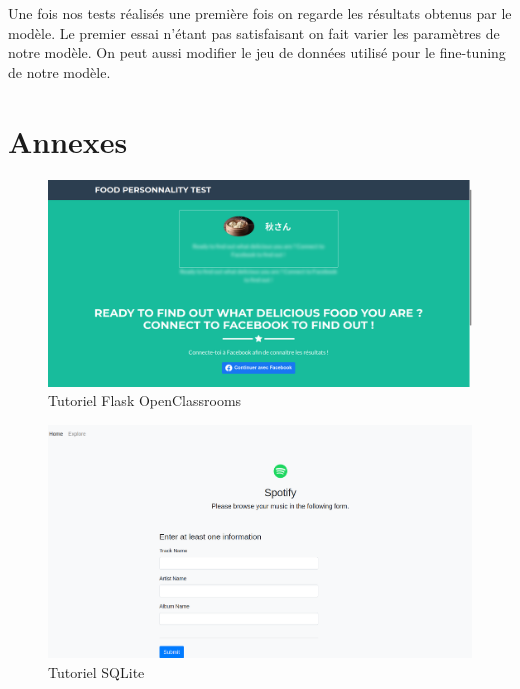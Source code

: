 \documentclass[12pt]{article}
\begin{document}
Une fois nos tests réalisés une première fois on regarde les résultats obtenus par le modèle. Le premier essai n'étant pas satisfaisant on fait varier les paramètres de notre modèle. On peut aussi modifier le jeu de données utilisé pour le fine-tuning de notre modèle. 


\newpage

\section{Annexes}

\begin{figure}[h]
        \centering
        \includegraphics[scale=0.27]{tuto_OC.png}
        \caption{Tutoriel Flask OpenClassrooms}
        \label{fig:tuto_OC}
\end{figure}

\begin{figure}
    \centering
    \includegraphics[scale=0.3]{tuto_sqlite.png}
    \caption{Tutoriel SQLite}
    \label{fig:tuto_sqlite}
\end{figure}
\end{document}
